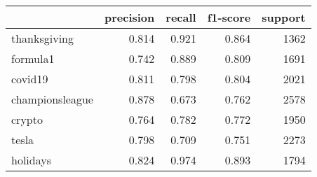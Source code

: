 \begin{tabular}{lrrrr}
\toprule
{} &  precision &  recall &  f1-score &  support \\
\midrule
thanksgiving    &      0.814 &   0.921 &     0.864 &     1362 \\
formula1        &      0.742 &   0.889 &     0.809 &     1691 \\
covid19         &      0.811 &   0.798 &     0.804 &     2021 \\
championsleague &      0.878 &   0.673 &     0.762 &     2578 \\
crypto          &      0.764 &   0.782 &     0.772 &     1950 \\
tesla           &      0.798 &   0.709 &     0.751 &     2273 \\
holidays        &      0.824 &   0.974 &     0.893 &     1794 \\
\bottomrule
\end{tabular}

